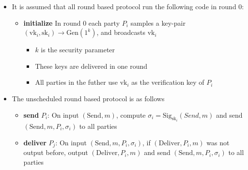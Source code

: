 \documentclass[11pt]{article}
\begin{document}
\begin{itemize}
\item It is assumed that all round based protocol run the following code in round 0:
\begin{itemize}
\item \textbf{initialize} In round \(0\) each party \(P_i\) samples a key-pair \((\text{vk}_i,\text{sk}_i) \rightarrow \text{Gen}(1^k)\), and broadcasts \(\text{vk}_i\)
\begin{itemize}
\item \(k\) is the security parameter
\item These keys are delivered in one round
\item All parties in the futher use \(\text{vk}_i\) as the verification key of \(P_i\)
\end{itemize}
\end{itemize}

\item The unscheduled round based protocol is as follows
\begin{itemize}
\item \textbf{send} \(P_i\): On input \((\text{Send},m)\), compute \(\sigma_i=\text{Sig}_{\text{sk}_i}(Send,m)\) and send \((\text{Send},m,P_i,\sigma_i)\) to all parties
\item \textbf{deliver} \(P_j\): On input \((\text{Send},m,P_i,\sigma_i)\), if \((\text{Deliver}, P_i, m)\) was not output before, output \((\text{Deliver},P_i,m)\) and send \((\text{Send},m,P_i,\sigma_i)\) to all parties
\end{itemize}
\end{itemize}
\end{document}
